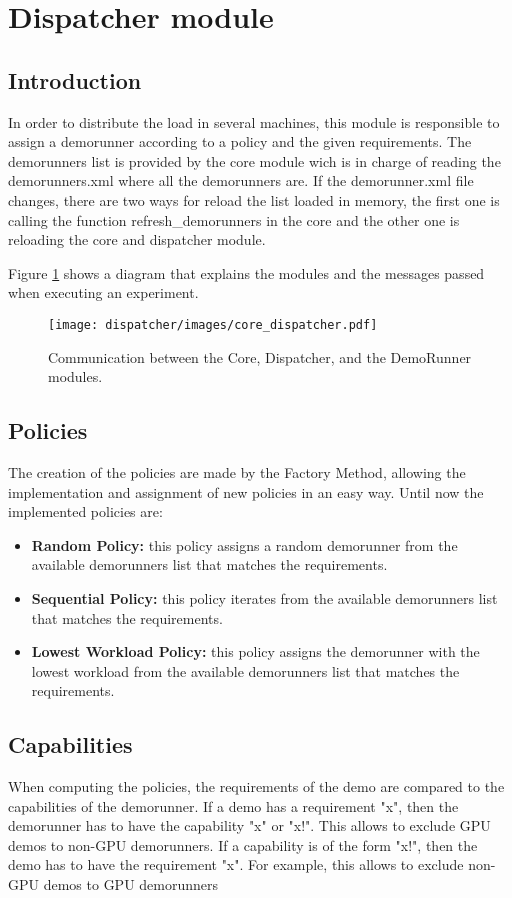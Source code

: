 \section{Dispatcher module}
\label{sec:Dispatcher}
\subsection{Introduction}
In order to distribute the load in several machines, this module is responsible to assign a demorunner according to a policy and the given requirements. 
The demorunners list is provided by the core module wich is in charge of reading the demorunners.xml where all the demorunners are. If the 
demorunner.xml file changes, there are two ways for reload the list loaded in memory, the first one is calling the function refresh\_demorunners
in the core and the other one is reloading the core and dispatcher module.

Figure \ref{fig:core_diagram} shows a diagram that explains the modules and the messages passed when executing an experiment. 
%
\begin{figure}[!ht]
\centering
\texttt{[image: dispatcher/images/core\_dispatcher.pdf]}
\caption{Communication between the Core, Dispatcher, and the DemoRunner modules.}
\label{fig:core_diagram}
\end{figure}

\subsection{Policies}
The creation of the policies are made by the Factory Method, allowing the implementation and assignment of new policies in an easy way.
Until now the implemented policies are:

\begin{itemize}
\item \textbf{Random Policy:} this policy assigns a random demorunner from the available demorunners list that matches the requirements.
\item \textbf{Sequential Policy:} this policy iterates from the available demorunners list that matches the requirements.
\item \textbf{Lowest Workload Policy:} this policy assigns the demorunner with the lowest workload from the available demorunners list that matches the requirements.
\end{itemize}

\subsection{Capabilities}
When computing the policies, the requirements of the demo are compared to the capabilities of the demorunner.
If a demo has a requirement "x", then the demorunner has to have the capability "x" or "x!". This allows to exclude GPU demos to non-GPU demorunners.
If a capability is of the form "x!", then the demo has to have the requirement "x". For example, this allows to exclude non-GPU demos to GPU demorunners

